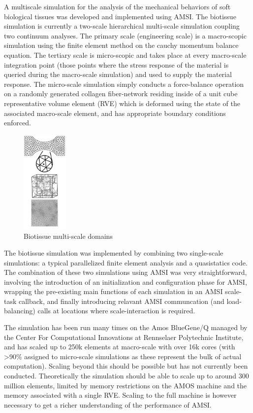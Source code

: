 A multiscale simulation for the analysis of the mechanical behaviors of soft biological tissues was developed and implemented using AMSI. The biotissue simulation is currently a two-scale hierarchical multi-scale simulation coupling two continuum analyses. The primary scale (engineering scale) is a macro-scopic simulation using the finite element method on the cauchy momentum balance equation. The tertiary scale is micro-scopic and takes place at every macro-scale integration point (those points where the stress response of the material is queried during the macro-scale simulation) and used to supply the material response. The micro-scale simulation simply conducts a force-balance operation on a randomly generated collagen fiber-network residing inside of a unit cube representative volume element (RVE) which is deformed using the state of the associated macro-scale element, and has appropriate boundary conditions enforced.

\begin{figure}
  \begin{center}
    \includegraphics[height=2in]{biotissue-scales.png}
  \end{center}
  \caption{\small Biotissue multi-scale domains}
  \label{biotissue_scales}
\end{figure}

The biotissue simulation was implemented by combining two single-scale simulations: a typical parallelized finite element analysis and a quasistatics code. The combination of these two simulations using AMSI was very straightforward, involving the introduction of an initialization and configuration phase for AMSI, wrapping the pre-existing main functions of each simulation in an AMSI scale-task callback, and finally introducing relavant AMSI communcation (and load-balancing) calls at locations where scale-interaction is required. 

The simulation has been run many times on the Amos BlueGene/Q managed by the Center For Computational Innovations at Rennselaer Polytechnic Institute, and has scaled up to 250k elements at macro-scale with over 16k cores (with >90\% assigned to micro-scale simulations as these represent the bulk of actual computation). Scaling beyond this should be possible but has not currently been conducted. Theoretically the simulation should be able to scale up to around 300 million elements, limited by memory restrictions on the AMOS machine and the memory associated with a single RVE. Scaling to the full machine is however necessary to get a richer understanding of the performance of AMSI.

